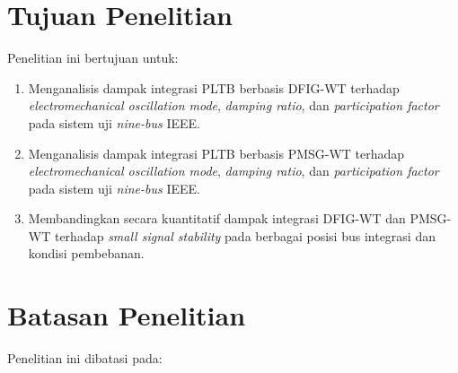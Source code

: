 \section{Tujuan Penelitian}

Penelitian ini bertujuan untuk:

\begin{enumerate}
	\item Menganalisis dampak integrasi PLTB berbasis DFIG-WT terhadap
	\textit{electromechanical oscillation mode}, \textit{damping ratio}, dan
	\textit{participation factor} pada sistem uji \textit{nine-bus} IEEE.
	\item Menganalisis dampak integrasi PLTB berbasis PMSG-WT terhadap
	\textit{electromechanical oscillation mode}, \textit{damping ratio}, dan
	\textit{participation factor} pada sistem uji \textit{nine-bus} IEEE.
	\item Membandingkan secara kuantitatif dampak integrasi DFIG-WT dan PMSG-WT
	terhadap \textit{small signal stability} pada berbagai posisi bus integrasi
	dan kondisi pembebanan.
\end{enumerate}


\section{Batasan Penelitian}

Penelitian ini dibatasi pada:

